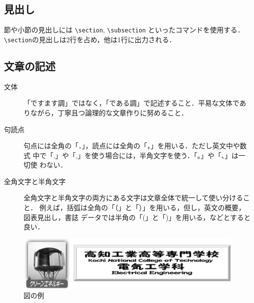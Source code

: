 \documentclass[a4j]{jarticle}
\begin{document}
\begin{Abstract}
\subsection{見出し}

節や小節の見出しには \verb|\section|, \verb|\subsection| といったコマンドを使用する．
\verb|\section|の見出しは2行を占め，他は1行に出力される．

\subsection{文章の記述}

\begin{description}
\item[文体]
「ですます調」ではなく，「である調」で記述すること．平易な文体でありながら，丁寧且つ論理的な文章作りに努めること．

\item[句読点]
句点には全角の「．」，読点には全角の「，」を用いる．ただし英文中や数式
中で「.」や「,」を使う場合には，半角文字を使う．「。」や「、」は一切使
わない．

\item[全角文字と半角文字]
全角文字と半角文字の両方にある文字は文章全体で統一して使い分けること．
例えば，括弧は全角の「（」と「）」を用いる，但し，英文の概要，図表見出し，書誌
データでは半角の「(」と「)」を用いる，などとすると良い．
\end{description}



\begin{figure}[tb]
  \begin{center}
    \includegraphics[keepaspectratio=true,height=.20\hsize]{KNCT-EE.eps}
  \end{center}
  \caption{図の例}%
  \label{KNCT-EE}
\end{figure}


\end{Abstract}
\end{document}
